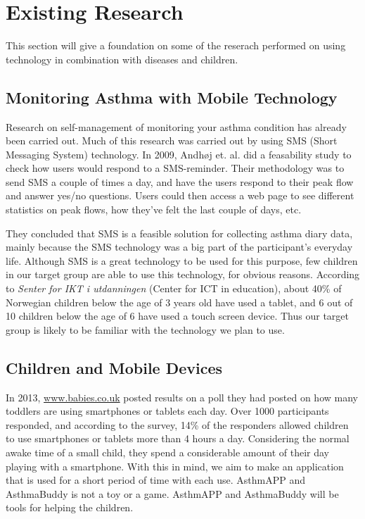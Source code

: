 \section{Existing Research}
\label{sec:existing-research}

This section will give a foundation on some of the reserach performed on using technology in combination with diseases and children. 


\subsection{Monitoring Asthma with Mobile Technology}
Research on self-management of monitoring your asthma condition has already been carried out. Much of this research was carried out by using SMS (Short Messaging System) technology. In 2009, Andh\o j  et. al.\cite{anhoj2004feasibility} did a feasability study to check how users would respond to a SMS-reminder. Their methodology was to send SMS a couple of times a day, and have the users respond to their peak flow and answer yes/no questions. Users could then access a web page to see different statistics on peak flows, how they've felt the last couple of days, etc.

They concluded that SMS is a feasible solution for collecting asthma diary data, mainly because the SMS technology was a big part of the participant's everyday life. Although SMS is a great technology to be used for this purpose, few children in our target group are able to use this technology, for obvious reasons. According to \emph{Senter for IKT i utdanningen} (Center for ICT in education), about 40\% of Norwegian children below the age of 3 years old have used a tablet, and 6 out of 10 children below the age of 6 have used a touch screen device\cite{nrkchilduse}. Thus our target group is likely to be familiar with the technology we plan to use.  


\subsection{Children and Mobile Devices}
In 2013, \url{www.babies.co.uk} posted results on a poll they had posted on how many toddlers are using smartphones or tablets each day\cite{babiesusageoftablets}. Over 1000 participants responded,  and according to the survey, 14\% of the responders allowed children to use smartphones or tablets more than 4 hours a day. Considering the normal awake time of a small child, they spend a considerable amount of their day playing with a smartphone. With this in mind, we aim to make an application that is used for a short period of time with each use. AsthmAPP and AsthmaBuddy is not a toy or a game. AsthmAPP and AsthmaBuddy will be tools for helping the children.


